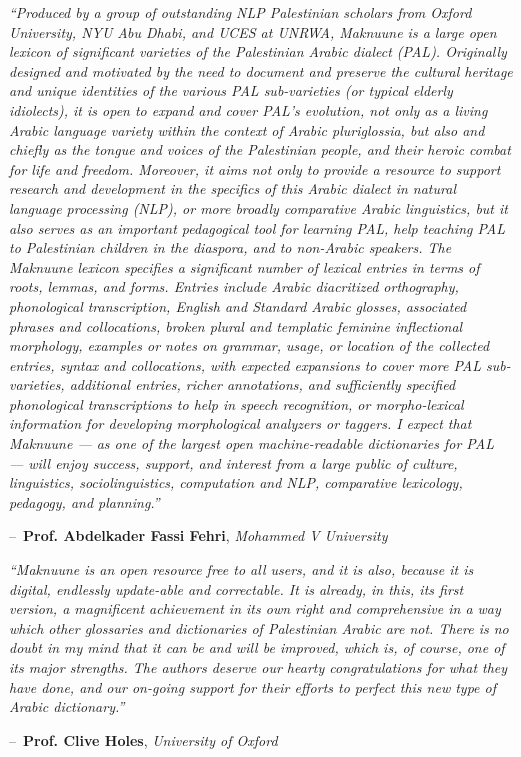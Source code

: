 \documentclass[11pt]{book}
\makeatletter
\newenvironment{chapquote}[2][2em]
  {\setlength{\@tempdima}{#1}%
   \def\chapquote@author{#2}%
   \parshape 1 \@tempdima \dimexpr\textwidth-2\@tempdima\relax%
   \itshape}
  {\par\normalfont\hfill--\ \chapquote@author\hspace*{\@tempdima}\par\bigskip}
\makeatother
\begin{document}
\begin{chapquote}{\textbf{Prof.  Abdelkader Fassi Fehri}, \textit{Mohammed V University
}}
``Produced by a group of outstanding NLP Palestinian scholars from Oxford University, NYU Abu Dhabi, and UCES at UNRWA, Maknuune is a large open lexicon of significant varieties of the Palestinian Arabic dialect (PAL). Originally designed and motivated by the need to document and preserve the cultural heritage and unique identities of the various PAL sub-varieties (or typical elderly idiolects), it is open to expand and cover PAL’s evolution, not only as a living Arabic language variety within the context of Arabic pluriglossia, but also and chiefly as the tongue and voices of the Palestinian people, and their heroic combat for life and freedom. Moreover, it aims not only to provide a resource to support research and development in the specifics of this Arabic dialect in natural language processing (NLP), or more broadly comparative Arabic linguistics, but it also serves as an important pedagogical tool for learning PAL, help teaching PAL to Palestinian children in the diaspora, and to non-Arabic speakers.
The Maknuune lexicon specifies a significant number of lexical entries in terms of roots, lemmas, and forms. Entries include Arabic diacritized orthography, phonological transcription, English and Standard Arabic glosses, associated phrases and collocations, broken plural and templatic feminine inflectional morphology, examples or notes on grammar, usage, or location of the collected entries, syntax and collocations, with expected expansions to cover more PAL sub-varieties, additional entries, richer annotations, and sufficiently specified phonological transcriptions to help in speech recognition, or morpho-lexical information for developing morphological analyzers or taggers.  
I expect that Maknuune — as one of the largest open machine-readable dictionaries for PAL — will enjoy success, support, and interest from a large public of culture, linguistics, sociolinguistics, computation and NLP, comparative lexicology, pedagogy, and planning.''
\end{chapquote}

\vspace{5mm}
\thispagestyle{empty}

\begin{chapquote}{\textbf{Prof. Clive Holes}, \textit{University of Oxford
}}
``Maknuune is an open resource free to all users, and it is also, because it is digital, endlessly update-able and correctable. It is already, in this, its first version, a magnificent achievement in its own right and comprehensive in a way which other glossaries and dictionaries of Palestinian Arabic are not. There is no doubt in my mind that it can be and will be improved, which is, of course, one of its major strengths.  The authors deserve our hearty congratulations for what they have done, and our on-going support for their efforts to perfect this new type of Arabic dictionary.''
\end{chapquote}
\end{document}
